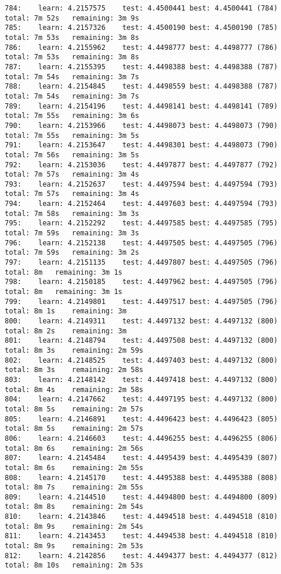 \documentclass[11pt]{article}
\begin{document}
\begin{Verbatim}[commandchars=\\\{\}]
784:	learn: 4.2157575	test: 4.4500441	best: 4.4500441 (784)	total: 7m 52s	remaining: 3m 9s
785:	learn: 4.2157326	test: 4.4500190	best: 4.4500190 (785)	total: 7m 53s	remaining: 3m 8s
786:	learn: 4.2155962	test: 4.4498777	best: 4.4498777 (786)	total: 7m 53s	remaining: 3m 8s
787:	learn: 4.2155395	test: 4.4498388	best: 4.4498388 (787)	total: 7m 54s	remaining: 3m 7s
788:	learn: 4.2154845	test: 4.4498559	best: 4.4498388 (787)	total: 7m 54s	remaining: 3m 7s
789:	learn: 4.2154196	test: 4.4498141	best: 4.4498141 (789)	total: 7m 55s	remaining: 3m 6s
790:	learn: 4.2153966	test: 4.4498073	best: 4.4498073 (790)	total: 7m 55s	remaining: 3m 5s
791:	learn: 4.2153647	test: 4.4498301	best: 4.4498073 (790)	total: 7m 56s	remaining: 3m 5s
792:	learn: 4.2153036	test: 4.4497877	best: 4.4497877 (792)	total: 7m 57s	remaining: 3m 4s
793:	learn: 4.2152637	test: 4.4497594	best: 4.4497594 (793)	total: 7m 57s	remaining: 3m 4s
794:	learn: 4.2152464	test: 4.4497603	best: 4.4497594 (793)	total: 7m 58s	remaining: 3m 3s
795:	learn: 4.2152292	test: 4.4497585	best: 4.4497585 (795)	total: 7m 59s	remaining: 3m 3s
796:	learn: 4.2152138	test: 4.4497505	best: 4.4497505 (796)	total: 7m 59s	remaining: 3m 2s
797:	learn: 4.2151135	test: 4.4497807	best: 4.4497505 (796)	total: 8m	remaining: 3m 1s
798:	learn: 4.2150185	test: 4.4497962	best: 4.4497505 (796)	total: 8m	remaining: 3m 1s
799:	learn: 4.2149801	test: 4.4497517	best: 4.4497505 (796)	total: 8m 1s	remaining: 3m
800:	learn: 4.2149311	test: 4.4497132	best: 4.4497132 (800)	total: 8m 2s	remaining: 3m
801:	learn: 4.2148794	test: 4.4497508	best: 4.4497132 (800)	total: 8m 3s	remaining: 2m 59s
802:	learn: 4.2148525	test: 4.4497403	best: 4.4497132 (800)	total: 8m 3s	remaining: 2m 58s
803:	learn: 4.2148142	test: 4.4497418	best: 4.4497132 (800)	total: 8m 4s	remaining: 2m 58s
804:	learn: 4.2147662	test: 4.4497195	best: 4.4497132 (800)	total: 8m 5s	remaining: 2m 57s
805:	learn: 4.2146891	test: 4.4496423	best: 4.4496423 (805)	total: 8m 5s	remaining: 2m 57s
806:	learn: 4.2146603	test: 4.4496255	best: 4.4496255 (806)	total: 8m 6s	remaining: 2m 56s
807:	learn: 4.2145484	test: 4.4495439	best: 4.4495439 (807)	total: 8m 6s	remaining: 2m 55s
808:	learn: 4.2145170	test: 4.4495388	best: 4.4495388 (808)	total: 8m 7s	remaining: 2m 55s
809:	learn: 4.2144510	test: 4.4494800	best: 4.4494800 (809)	total: 8m 8s	remaining: 2m 54s
810:	learn: 4.2143846	test: 4.4494518	best: 4.4494518 (810)	total: 8m 9s	remaining: 2m 54s
811:	learn: 4.2143453	test: 4.4494538	best: 4.4494518 (810)	total: 8m 9s	remaining: 2m 53s
812:	learn: 4.2142856	test: 4.4494377	best: 4.4494377 (812)	total: 8m 10s	remaining: 2m 53s

\end{Verbatim}
\end{document}

